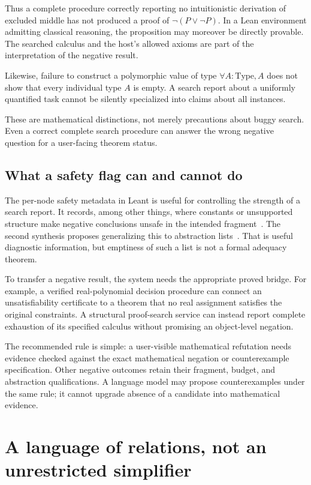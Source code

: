 \documentclass[11pt,a4paper]{article}
\theoremstyle{definition}
\begin{document}
Thus a complete procedure correctly reporting no intuitionistic derivation of excluded middle has not produced a proof of \(\neg(P\lor\neg P)\). In a Lean environment admitting classical reasoning, the proposition may moreover be directly provable. The searched calculus and the host's allowed axioms are part of the interpretation of the negative result.

Likewise, failure to construct a polymorphic value of type \(\forall A:\mathrm{Type},A\) does not show that every individual type \(A\) is empty. A search report about a uniformly quantified task cannot be silently specialized into claims about all instances.

These are mathematical distinctions, not merely precautions about buggy search. Even a correct complete search procedure can answer the wrong negative question for a user-facing theorem status.

\subsection{What a safety flag can and cannot do}
The per-node safety metadata in Leant is useful for controlling the strength of a search report. It records, among other things, where constants or unsupported structure make negative conclusions unsafe in the intended fragment~\cite{lfragment}. The second synthesis proposes generalizing this to abstraction lists~\cite{synB}. That is useful diagnostic information, but emptiness of such a list is not a formal adequacy theorem.

To transfer a negative result, the system needs the appropriate proved bridge. For example, a verified real-polynomial decision procedure can connect an unsatisfiability certificate to a theorem that no real assignment satisfies the original constraints. A structural proof-search service can instead report complete exhaustion of its specified calculus without promising an object-level negation.

The recommended rule is simple: a user-visible mathematical refutation needs evidence checked against the exact mathematical negation or counterexample specification. Other negative outcomes retain their fragment, budget, and abstraction qualifications. A language model may propose counterexamples under the same rule; it cannot upgrade absence of a candidate into mathematical evidence.

\section{A language of relations, not an unrestricted simplifier}\label{sec:relations}
\end{document}
